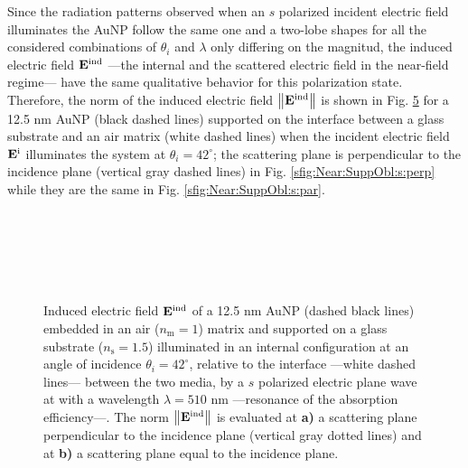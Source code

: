 Since the radiation patterns observed when an $s$ polarized incident electric field illuminates the AuNP follow the same one and a two-lobe shapes for all the considered combinations of $\theta_i$ and $\lambda$ only differing on the magnitud, the induced electric field $\vb{E}^\text{ind}$ ---the internal and the scattered electric field in the near-field regime--- have the same qualitative behavior for this polarization state. Therefore, the norm of the induced electric field $\norm{\vb{E}^\text{ind}}$ is shown in Fig. \ref{fig:Near:SuppObl:s} for a 12.5 nm AuNP (black dashed lines) supported on the interface between a glass substrate and an air matrix (white dashed lines) when the incident electric field $\vb{E}^\text{i}$ illuminates the system at $\theta_i = 42^\circ$; the scattering plane is perpendicular to the incidence plane (vertical gray dashed lines) in Fig. \ref{sfig:Near:SuppObl:s:perp} while they are the same in Fig. \ref{sfig:Near:SuppObl:s:par}.

\begin{figure}[h!]\centering
   \def\svgwidth{.75\textwidth}
   \footnotesize
   \\[-32.6em]
   \hspace*{-.25\textwidth}
       \begin{subfigure}{.25\textwidth}\textcolor{red}{\caption{ } \label{sfig:Near:SuppObl:s:15}}\end{subfigure}%
       \begin{subfigure}{.34\textwidth}\caption{ }\label{sfig:Near:SuppObl:s:38}\end{subfigure}\\[13em]
    \hspace*{-.25\textwidth}
       \begin{subfigure}{.25\textwidth}\textcolor{red}{\caption{ } \label{sfig:Near:SuppObl:s:42}}\end{subfigure}%
       \begin{subfigure}{.34\textwidth}\caption{ }\label{sfig:Near:SuppObl:s:75}\end{subfigure}\\[15em]
   \caption[Induced Electric Field of a 12.5 nm Au NP on substrate illuminated at oblique incidence with a $s$ polarized electric field]{Induced electric field $\vb{E}^\text{ind}$ of a 12.5 nm AuNP (dashed black lines) embedded in an air  ($n_\text{m} = 1$)  matrix and supported on a glass substrate ($n_\text{s} = 1.5$) illuminated in an internal configuration at an angle of incidence $\theta_i = 42^\circ$, relative to the interface ---white dashed lines--- between the two media, by a $s$ polarized electric plane wave at with a wavelength $\lambda = 510$ nm ---resonance of the absorption efficiency---.  The norm $\norm{\vb{E}^\text{ind}}$ is evaluated at  \textbf{a)} a scattering plane perpendicular to the incidence plane (vertical gray dotted lines) and at \textbf{b)} a scattering plane equal to the incidence plane. }
   \label{fig:Near:SuppObl:s}
 \end{figure}


